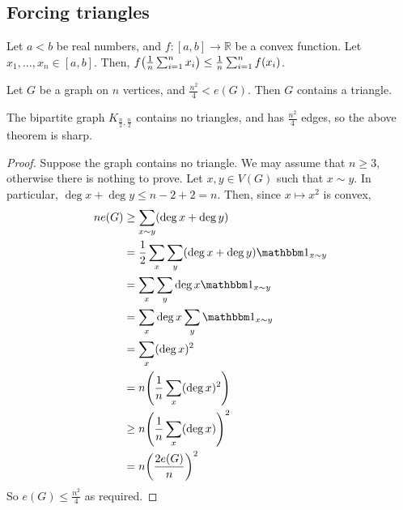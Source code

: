\subsection{Forcing triangles}
\begin{proposition}[Jensen]
	Let \( a < b \) be real numbers, and \( f \colon [a,b] \to \mathbb R \) be a convex function.
	Let \( x_1, \dots, x_n \in [a,b] \).
	Then, \( f\qty(\frac{1}{n}\sum_{i=1}^n x_i) \leq \frac{1}{n} \sum_{i=1}^n f(x_i) \).
\end{proposition}
\begin{theorem}[Mantel]
	Let \( G \) be a graph on \( n \) vertices, and \( \frac{n^2}{4} < e(G) \).
	Then \( G \) contains a triangle.
\end{theorem}
\begin{remark}
	The bipartite graph \( K_{\frac{n}{2}, \frac{n}{2}} \) contains no triangles, and has \( \frac{n^2}{4} \) edges, so the above theorem is sharp.
\end{remark}
\begin{proof}
	Suppose the graph contains no triangle.
	We may assume that \( n \geq 3 \), otherwise there is nothing to prove.
	Let \( x, y \in V(G) \) such that \( x \sim y \).
	In particular, \( \deg x + \deg y \leq n - 2 + 2 = n \).
	Then, since \( x \mapsto x^2 \) is convex,
	\begin{align*}
		ne(G) &\geq \sum_{x \sim y} (\deg x + \deg y) \\
		&= \frac{1}{2} \sum_x \sum_y (\deg x + \deg y) \mathbbm 1_{x \sim y} \\
		&= \sum_x \sum_y \deg x \mathbbm 1_{x \sim y} \\
		&= \sum_x \deg x \sum_y \mathbbm 1_{x \sim y} \\
		&= \sum_x (\deg x)^2 \\
		&= n \qty( \frac{1}{n} \sum_x (\deg x)^2 ) \\
		&\geq n \qty( \frac{1}{n} \sum_x (\deg x) )^2 \\
		&= n \qty( \frac{2e(G)}{n} )^2
	\end{align*}
	So \( e(G) \leq \frac{n^2}{4} \) as required.
\end{proof}

